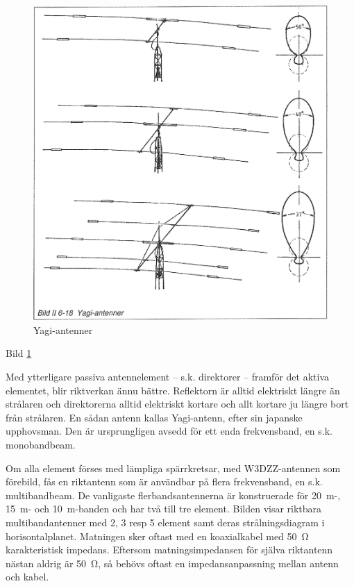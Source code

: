 \begin{figure}
  \includegraphics[width=\textwidth]{images/bild_2_6-18}
  \caption{Yagi-antenner}
  \label{fig:bildII6-18}
\end{figure}

Bild \ref{fig:bildII6-18}

Med ytterligare passiva antennelement -- s.k. direktorer -- framför det
aktiva elementet, blir riktverkan ännu bättre. Reflektorn är alltid
elektriskt längre än strålaren och direktorerna alltid elektriskt
kortare och allt kortare ju längre bort från strålaren. En sådan
antenn kallas Yagi-antenn, efter sin japanske upphovsman. Den är
ursprungligen avsedd för ett enda frekvensband, en s.k. monobandbeam.

Om alla element förses med lämpliga spärrkretsar, med W3DZZ-antennen
som förebild, fås en riktantenn som är användbar på flera
frekvensband, en s.k. multibandbeam. De vanligaste flerbandsantennerna
är konstruerade för 20~m-, 15~m- och 10~m-banden och har två till tre
element.  Bilden visar riktbara multibandantenner med 2, 3 resp 5
element samt deras strålningsdiagram i horisontalplanet.  Matningen
sker oftast med en koaxialkabel med 50~Ω karakteristisk
impedans. Eftersom matningsimpedansen för själva riktantenn nästan
aldrig är 50~Ω, så behövs oftast en impedansanpassning mellan antenn
och kabel.

